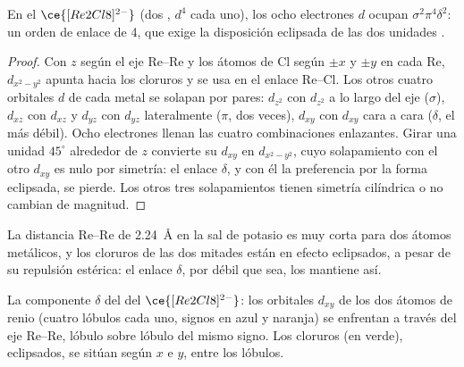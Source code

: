 \begin{proposition}\label{prop:b3:organometallic-bonding:quadruple}
En el $\ce{[Re2Cl8]^{2-}}$ (dos , $d^4$ cada uno), los ocho electrones $d$ ocupan $\sigma^2\pi^4\delta^2$: un orden
de enlace de 4, que exige la disposición eclipsada de las dos unidades .
\end{proposition}

\begin{proof}
Con $z$ según el eje Re--Re y los átomos de Cl según $\pm x$ y $\pm y$ en cada Re, $d_{x^2-y^2}$
apunta hacia los cloruros y se usa en el enlace Re--Cl. Los otros cuatro orbitales $d$
de cada metal se solapan por pares: $d_{z^2}$ con $d_{z^2}$ a lo largo del eje ($\sigma$), $d_{xz}$ con $d_{xz}$ y $d_{yz}$
con $d_{yz}$ lateralmente ($\pi$, dos veces), $d_{xy}$ con $d_{xy}$ cara a cara ($\delta$, el más débil).
Ocho electrones llenan las cuatro combinaciones enlazantes. Girar una unidad $45^\circ$
alrededor de $z$ convierte su $d_{xy}$ en $d_{x^2-y^2}$, cuyo solapamiento con el otro $d_{xy}$ es nulo por
simetría: el enlace $\delta$, y con él la preferencia por la forma eclipsada, se pierde. Los
otros tres solapamientos tienen simetría cilíndrica o no cambian de magnitud.
\end{proof}

La distancia Re--Re de \qty{2.24}{\angstrom} en la sal de potasio es muy corta para dos átomos metálicos, y los cloruros de las dos mitades están en efecto eclipsados, a pesar de
su repulsión estérica: el enlace $\delta$, por débil que sea, los mantiene así.

\begin{omfigure}

{\small La componente $\delta$ del  del $\ce{[Re2Cl8]^{2-}}$: los orbitales $d_{xy}$ de
los dos átomos de renio (cuatro lóbulos cada uno, signos en azul y naranja) se enfrentan
a través del eje Re--Re, lóbulo sobre lóbulo del mismo signo. Los cloruros (en verde),
eclipsados, se sitúan según $x$ e $y$, entre los lóbulos.}
\end{omfigure}

